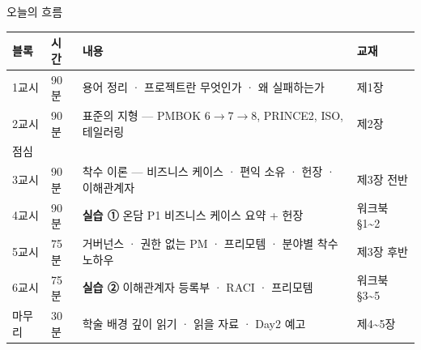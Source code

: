 \begin{frame}[allowframebreaks=1.0]{오늘의 흐름}
\small
{\footnotesize\setlength{\tabcolsep}{3pt}\renewcommand{\arraystretch}{1.12}
\begin{tabular}{@{}>{\raggedright\arraybackslash}p{}>{\raggedright\arraybackslash}p{}>{\raggedright\arraybackslash}p{}>{\raggedright\arraybackslash}p{}@{}}
\toprule
\textbf{블록} & \textbf{시간} & \textbf{내용} & \textbf{교재} \\
\midrule
1교시 & 90분 & 용어 정리 · 프로젝트란 무엇인가 · 왜 실패하는가 & 제1장 \\
2교시 & 90분 & 표준의 지형 — PMBOK 6$\rightarrow$7$\rightarrow$8, PRINCE2, ISO, 테일러링 & 제2장 \\
점심 &  &  &  \\
3교시 & 90분 & 착수 이론 — 비즈니스 케이스 · 편익 소유 · 헌장 · 이해관계자 & 제3장 전반 \\
4교시 & 90분 & \textbf{실습 ①} 온담 P1 비즈니스 케이스 요약 + 헌장 & 워크북 §1\textasciitilde{}2 \\
5교시 & 75분 & 거버넌스 · 권한 없는 PM · 프리모템 · 분야별 착수 노하우 & 제3장 후반 \\
6교시 & 75분 & \textbf{실습 ②} 이해관계자 등록부 · RACI · 프리모템 & 워크북 §3\textasciitilde{}5 \\
마무리 & 30분 & 학술 배경 깊이 읽기 · 읽을 자료 · Day2 예고 & 제4\textasciitilde{}5장 \\
\bottomrule
\end{tabular}}
\par\smallskip
{}
\end{frame}

